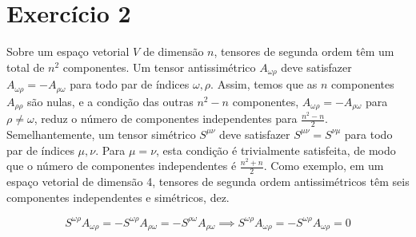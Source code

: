 \section*{Exercício 2}
Sobre um espaço vetorial \(V\) de dimensão \(n\), tensores de segunda ordem têm um total de \(n^2\) componentes. Um tensor antissimétrico \(A_{\omega\rho}\) deve satisfazer \(A_{\omega\rho} = -A_{\rho\omega}\) para todo par de índices \(\omega,\rho\). Assim, temos que as \(n\) componentes \(A_{\rho \rho}\) são nulas, e a condição das outras \(n^2 - n\) componentes, \(A_{\omega\rho} = - A_{\rho\omega}\) para \(\rho \neq \omega\), reduz o número de componentes independentes para \(\frac{n^2 - n}{2}\). Semelhantemente, um tensor simétrico \(S^{\mu\nu}\) deve satisfazer \(S^{\mu\nu} = S^{\nu\mu}\) para todo par de índices \(\mu, \nu\). Para \(\mu = \nu\), esta condição é trivialmente satisfeita, de modo que o número de componentes independentes é \(\frac{n^2 + n}{2}\). Como exemplo, em um espaço vetorial de dimensão 4, tensores de segunda ordem antissimétricos têm seis componentes independentes e simétricos, dez.

\begin{equation*}
    S^{\omega\rho}A_{\omega \rho} = - S^{\omega\rho}A_{\rho\omega} = - S^{\rho \omega} A_{\rho \omega} \implies S^{\omega\rho}A_{\omega\rho} = -S^{\omega\rho}A_{\omega\rho} = 0
\end{equation*}
